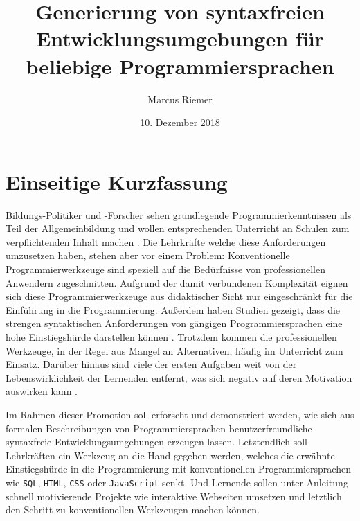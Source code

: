 \documentclass[paper=a4,fontsize=11pt,parskip=half]{scrartcl}
\title{Generierung von syntaxfreien Entwicklungsumgebungen für beliebige Programmiersprachen}
\author{Marcus Riemer}
\date{10. Dezember 2018}
\begin{document}
\pagestyle{empty}

\maketitle
\tableofcontents

\clearpage
{}
\section{Einseitige Kurzfassung}

Bildungs-Politiker und -Forscher sehen grundlegende Programmierkenntnissen als Teil der Allgemeinbildung und wollen entsprechenden Unterricht an Schulen zum verpflichtenden Inhalt machen \cite{noauthor_designierte_2018}. Die Lehrkräfte welche diese Anforderungen umzusetzen haben, stehen aber vor einem Problem: Konventionelle Programmierwerkzeuge sind speziell auf die Bedürfnisse von professionellen Anwendern zugeschnitten. Aufgrund der damit verbundenen Komplexität eignen sich diese Programmierwerkzeuge aus didaktischer Sicht nur eingeschränkt für die Einführung in die Programmierung. Außerdem haben Studien gezeigt, dass die strengen syntaktischen Anforderungen von gängigen Programmiersprachen eine hohe Einstiegshürde darstellen können \cite{resnick_scratch:_2009}. Trotzdem kommen die professionellen Werkzeuge, in der Regel aus Mangel an Alternativen, häufig im Unterricht zum Einsatz. Darüber hinaus sind viele der ersten Aufgaben weit von der Lebenswirklichkeit der Lernenden entfernt, was sich negativ auf deren Motivation auswirken kann \cite{resnick_scratch:_2009}.

Im Rahmen dieser Promotion soll erforscht und demonstriert werden, wie sich aus formalen Beschreibungen von Programmiersprachen benutzerfreundliche syntaxfreie Entwicklungsumgebungen erzeugen lassen. Letztendlich soll Lehrkräften ein Werkzeug an die Hand gegeben werden, welches die erwähnte Einstiegshürde in die Programmierung mit konventionellen Programmiersprachen wie \texttt{SQL}, \texttt{HTML}, \texttt{CSS} oder \texttt{JavaScript} senkt. Und Lernende sollen unter Anleitung schnell motivierende Projekte wie interaktive Webseiten umsetzen und letztlich den Schritt zu konventionellen Werkzeugen machen können.
\end{document}
